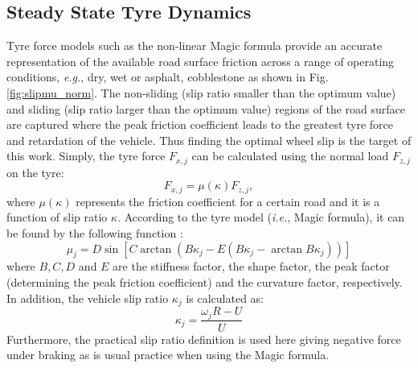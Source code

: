 \documentclass[onecolumn,journal,draftclsnofoot]{IEEEtran}
\begin{document}
\subsection{Steady State Tyre Dynamics}
Tyre force models such as the non-linear Magic formula provide an accurate representation of the available road surface friction across a range of operating conditions, \emph{e.g.}, dry, wet or asphalt, cobblestone as shown in Fig.~ \ref{fig:slipmu_norm}. The non-sliding (slip ratio smaller than the optimum value) and sliding  (slip ratio larger than the optimum value) regions of the road surface are captured where the peak friction coefficient leads to the greatest tyre force and retardation of the vehicle. Thus finding the optimal wheel slip is the target of this work. Simply, the tyre force $F_{x,j}$ can be calculated using the normal load $F_{z,j}$ on the tyre:
\begin{equation}\label{eqn:tforce}
    F_{x,j} = \mu(\kappa) F_{z,j},
\end{equation}
where $\mu(\kappa)$ represents the friction coefficient for a certain road and it is a function of slip ratio $\kappa$.
According to the tyre model (\emph{i.e.}, Magic formula), it can be found by the following function \cite{Pacejka2012}: 
\begin{equation}\label{eqn:mag}
    \mu_{j}=D\sin[C\arctan({B\kappa_{j}-E(B\kappa_{j}-\arctan B\kappa_{j})})]
\end{equation}
where \(B, C, D\) and \(E\) are the stiffness factor, the shape factor, the peak factor (determining the peak friction coefficient) and the curvature factor, respectively.
In addition, the vehicle slip ratio \(\kappa_j\) is calculated as:
\begin{equation}\label{eqn:slip}
    \kappa_{j} = \frac{\omega_{j} R - U}{U}
\end{equation}
Furthermore, the practical slip ratio definition is used here giving negative force under braking as is usual practice when using the Magic formula.
\end{document}
